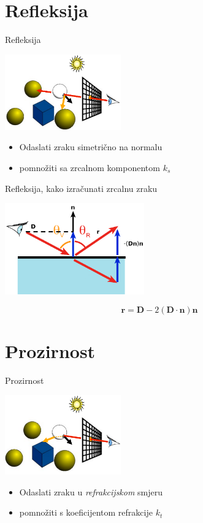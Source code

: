 \documentclass[9pt]{beamer}
\begin{document}
\section{Refleksija}
\begin{frame}{Refleksija}

\begin{center}
\includegraphics[width=5cm]{slike/refleksija_01.png}
\end{center}
\begin{itemize}
\item Odaslati zraku simetrično na normalu
\item pomnožiti sa zrcalnom komponentom $k_s$
\end{itemize}
\end{frame}

\begin{frame}{Refleksija, kako izračunati zrcalnu zraku}

\begin{center}
\includegraphics[width=6cm]{slike/refleksija_02.png}
\end{center}
$$\mathbf{r} = \mathbf{D} - 2(\mathbf{D}\cdot \mathbf{n})\mathbf{n}$$
\end{frame}


\section{Prozirnost}
\begin{frame}{Prozirnost}

\begin{center}
\includegraphics[width=5cm]{slike/prozirnost_01.png}
\end{center}
\begin{itemize}
\item Odaslati zraku u \textit{refrakcijskom} smjeru
\item pomnožiti s koeficijentom refrakcije $k_t$
\end{itemize}
\end{frame}
\end{document}
